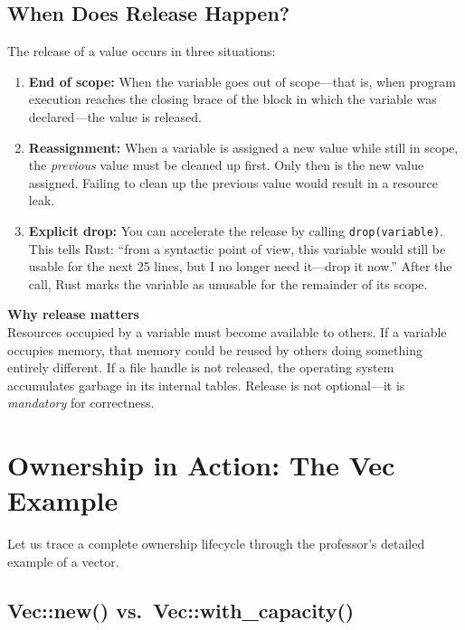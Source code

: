 \subsection{When Does Release Happen?}

The release of a value occurs in three situations:

\begin{enumerate}
    \item \textbf{End of scope:} When the variable goes out of scope---that is, when program execution reaches the closing brace of the block in which the variable was declared---the value is released.
    \item \textbf{Reassignment:} When a variable is assigned a new value while still in scope, the \emph{previous} value must be cleaned up first. Only then is the new value assigned. Failing to clean up the previous value would result in a resource leak.
    \item \textbf{Explicit drop:} You can accelerate the release by calling \texttt{drop(variable)}. This tells Rust: ``from a syntactic point of view, this variable would still be usable for the next 25 lines, but I no longer need it---drop it now.'' After the call, Rust marks the variable as unusable for the remainder of its scope.
\end{enumerate}

\begin{warningbox}
\textbf{Why release matters} \\
Resources occupied by a variable must become available to others. If a variable occupies memory, that memory could be reused by others doing something entirely different. If a file handle is not released, the operating system accumulates garbage in its internal tables. Release is not optional---it is \emph{mandatory} for correctness.
\end{warningbox}

\section{Ownership in Action: The Vec Example}

Let us trace a complete ownership lifecycle through the professor's detailed example of a vector.

\subsection{Vec::new() vs.\ Vec::with\_capacity()}

